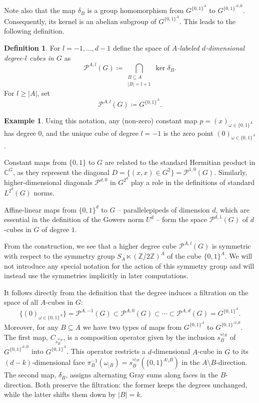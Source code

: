 \documentclass{amsart}
\theoremstyle{definition}
\newtheorem{definition}[theorem]{Definition}
\newtheorem{example}[theorem]{Example}
\theoremstyle{remark}
\numberwithin{equation}{section}
\begin{document}
Note also that the map $\delta_B$ is a group homomorphism from $G^{\{0,1\}^A}$ to $G^{\{0,1\}^{A\setminus B}}$. Consequently, its kernel is an abelian subgroup of $G^{\{0,1\}^A}$. This leads to the following definition.

\begin{definition}
\label{def:HDcubes} For $l = -1, \dots, d-1$ define the space of \textit{$A$-labeled $d$-dimensional degree-$l$ cubes in $G$}  as  
$$ \mathcal{P}^{A,l}(G) \coloneqq \bigcap_{\substack{B \subseteq A \\  |B|=l+1}} \ker \delta_B.$$
For $l \ge|A|$, set
$$ \mathcal{P}^{A,l}(G) \coloneqq G^{\{0,1\}^A}.$$
\end{definition}

\begin{example}
Using this notation, any (non-zero) constant map $p=(x)_{\omega \in \{0,1\}^A}$ has degree $0$, and the unique cube of degree $l=-1$ is the zero point $(0)_{\omega \in \{0,1\}^A}$. 

Constant maps from $\{0,1\}$ to $G$ are related to the standard Hermitian product in $\mathbb{C}^G$, as they represent the diagonal $D=\{(x,x)\in G^2\}=\mathcal{P}^{1,0}(G)$. Similarly, higher-dimensional diagonals $\mathcal{P}^{d,0}$ in $G^{2^d}$ play a role in the definitions of standard $L^{2^d}(G)$ norms.

Affine-linear maps from $\{0,1\}^d$ to $G$ -- parallelepipeds of dimension $d$, which are essential in the definition of the Gowers norm $U^d$ -- form the space $\mathcal{P}^{d,1}(G)$ of $d$-cubes in $G$ of degree $1$. 
\end{example}

From the construction, we see that a higher degree cube  $ \mathcal{P}^{A,l}(G)$ is symmetric with respect to the symmetry group $S_A \ltimes (\mathbb{Z}/2\mathbb{Z})^A$ of the cube $\{0,1\}^A$. We will not introduce any special notation for the action of this symmetry group and will instead use the symmetries implicitly in later computations.

It follows directly from the definition that the degree induces a filtration on the space of all $A$-cubes in $G$:
\begin{equation}
\label{Pfilter}    
\{ (0)_{\omega \in \{0,1\}^A}\}=\mathcal{P}^{A,-1}( G) \subset \mathcal{P}^{A,0}( G) \subset \cdots \subset \mathcal{P}^{A,d}(G) = G^{\{0,1\}^A}.\end{equation}
Moreover, for any $B \subseteq A$ we have two types of  maps  from  $G^{\{0,1\}^A}$ to  $G^{\{0,1\}^{A \setminus B}}$. The first map, $C_{s_{B}^{\omega_{|B}}}$, is a composition operator given by the inclusion $ s_{B}^{\omega_{|B}}$ of $G^{\{0,1\}^{A \setminus B}}$ into $G^{\{0,1\}^A}$. This operator restricts a $d$-dimensional $A$-cube in $G$ to its $(d-k)$-dimensional face $\pi_{B}^{-1}(\omega_{| B}) = s_{B}^{\omega_{|B}} \left( \{0,1\}^{A\setminus B}\right)$ in the $A\setminus B$-direction. The second map, $\delta_B$, assigns alternating Gray sums along faces in the $B$-direction. Both preserve the filtration: the former keeps the degrees unchanged, while the latter shifts them down by $|B|=k$. 
\end{document}

